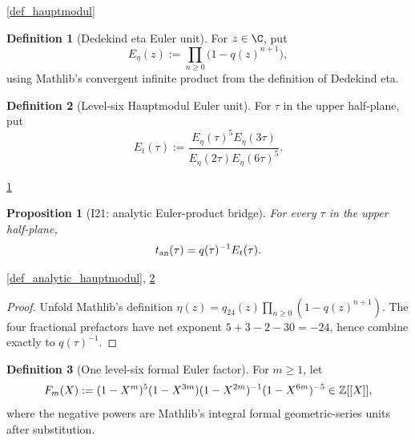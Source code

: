 \documentclass[11pt,a4paper]{article}
\numberwithin{equation}{section}
\theoremstyle{plain}\newtheorem{theorem}{Theorem}[section]\newaliascnt{proposition}{theorem}\newtheorem{proposition}[proposition]{Proposition}\aliascntresetthe{proposition}\newaliascnt{lemma}{theorem}\newtheorem{lemma}[lemma]{Lemma}\aliascntresetthe{lemma}
\theoremstyle{definition}\newaliascnt{definition}{theorem}\newtheorem{definition}[definition]{Definition}\aliascntresetthe{definition}\newaliascnt{notation}{theorem}\newtheorem{notation}[notation]{Notation}\aliascntresetthe{notation}
\providecommand{\lean}[1]{}\providecommand{\leanok}{}
\begin{document}
\begin{uses-statement}\ref{def_hauptmodul}\end{uses-statement}
\begin{definition}[Dedekind eta Euler unit]\label{def_eta_euler_unit}\lean{SptCM.Repair.etaEulerUnit}\leanok
For $z\in\C$, put
\[
E_\eta(z):=\prod_{n\ge0}\bigl(1-q(z)^{n+1}\bigr),
\]
using Mathlib's convergent infinite product from the definition of Dedekind
eta.
\end{definition}
\begin{definition}[Level-six Hauptmodul Euler unit]\label{def_hauptmodul_euler_unit}\lean{SptCM.Repair.hauptmodulEulerUnit}\leanok
For $\tau$ in the upper half-plane, put
\[
E_t(\tau):=\frac{E_\eta(\tau)^5E_\eta(3\tau)}
 {E_\eta(2\tau)E_\eta(6\tau)^5}.
\]
\end{definition}
\begin{uses-statement}\ref{def_eta_euler_unit}\end{uses-statement}
\begin{proposition}[I21: analytic Euler-product bridge]\label{prop_i21_analytic_euler_bridge}\lean{SptCM.Repair.analyticHauptmodul_eq_qParam_inv_mul_eulerUnit}\leanok
For every $\tau$ in the upper half-plane,
\[
t_{\rm an}(\tau)=q(\tau)^{-1}E_t(\tau).
\]
\end{proposition}
\begin{uses-statement}\ref{def_analytic_hauptmodul}, \ref{def_hauptmodul_euler_unit}\end{uses-statement}
\begin{proof}
Unfold Mathlib's definition
$\eta(z)=q_{24}(z)\prod_{n\ge0}(1-q(z)^{n+1})$.  The four fractional
prefactors have net exponent
$5+3-2-30=-24$, hence combine exactly to $q(\tau)^{-1}$.
\end{proof}
\begin{definition}[One level-six formal Euler factor]\label{def_hauptmodul_formal_euler_factor}\lean{SptCM.Repair.hauptmodulFormalEulerFactor}\leanok
For $m\ge1$, let
\[
F_m(X):=(1-X^m)^5(1-X^{3m})(1-X^{2m})^{-1}(1-X^{6m})^{-5}
\in\mathbb Z[[X]],
\]
where the negative powers are Mathlib's integral formal geometric-series
units after substitution.
\end{definition}
\end{document}
